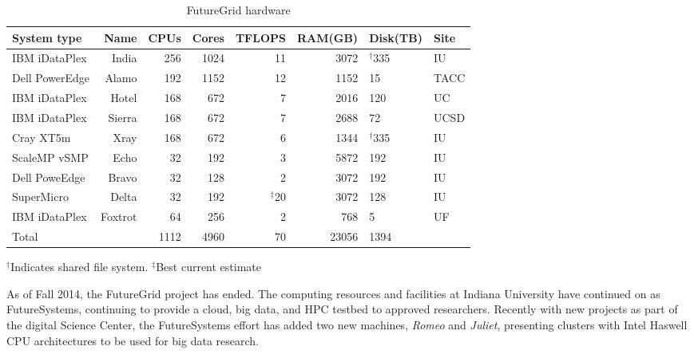\begin{table}
\caption{FutureGrid hardware}\label{T:fg-hardware}
\begin{tabular}{lrrrrrll}
\hline
System type & 
Name&
CPUs& 
Cores& 
TFLOPS& 
RAM(GB)& 
Disk(TB)& 
 Site \\
\hline
IBM iDataPlex	& India		& 256	& 1024	& 11	& 3072	& $^{\dagger}$335		& IU \\
\hline
Dell PowerEdge	& Alamo		& 192	& 1152	& 12	& 1152	& 15		        & TACC \\
\hline
IBM iDataPlex	& Hotel 	& 168	& 672	& 7	& 2016	& 120	 	        & UC \\
\hline
IBM iDataPlex	& Sierra	& 168	& 672	& 7	& 2688	& 72		& UCSD \\
\hline
Cray XT5m	& Xray		& 168	& 672	& 6	& 1344	& $^{\dagger}$335		& IU \\
\hline
ScaleMP vSMP	& Echo		& 32	& 192	& 3	& 5872	& 192		& IU \\
\hline
Dell PoweEdge	& Bravo		& 32	& 128	& 2	& 3072	& 192		& IU \\
\hline
SuperMicro	& Delta		& 32	& 192	& $^{\ddagger}$20	& 3072	& 128		& IU \\
\hline
IBM iDataPlex	& Foxtrot 	& 64	& 256	& 2	& 768	& 5 		& UF \\
\hline
\hline
Total	        & 	& 1112	& 4960	& 70	& 23056	& 1394           & \\		
\hline
\end{tabular}

$^{\dagger}$Indicates shared file system. $^{\ddagger}$Best current estimate
\end{table}

As of Fall 2014, the FutureGrid project has ended. The computing resources and facilities at Indiana University have continued on as FutureSystems, continuing to provide a cloud, big data, and HPC testbed to approved researchers. Recently with new projects as part of the digital Science Center, the FutureSystems effort has added two new machines, \emph{Romeo} and \emph{Juliet}, presenting clusters with Intel Haswell CPU architectures to be used for big data research.  

